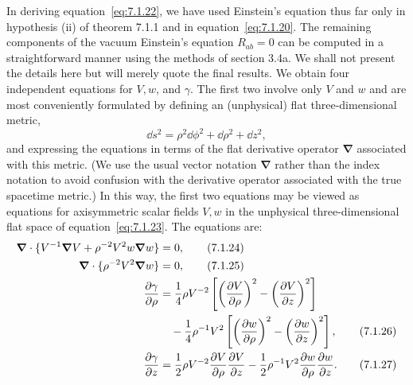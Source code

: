 In deriving equation~\eqref{eq:7.1.22}, we have used Einstein's equation thus far
only in hypothesis (ii) of theorem 7.1.1 and in equation~\eqref{eq:7.1.20}. The
remaining components of the vacuum Einstein's equation \(R_{ab}=0\) can be
computed in a straightforward manner using the methods of section 3.4a. We shall
not present the details here but will merely quote the final results. We obtain four
independent equations for \(V,w\), and \(\gamma\). The first two involve only
\(V\) and \(w\) and are most conveniently formulated by defining an (unphysical)
flat three-dimensional metric,
\begin{equation}
  \dd s^2=\rho^2\dd\phi^2+\dd\rho^2+\dd z^2 ,
  \tag{7.1.23}\label{eq:7.1.23}
\end{equation}
and expressing the equations in terms of the flat derivative operator \(\boldsymbol{\nabla}\)
associated with this metric. (We use the usual vector notation \(\boldsymbol{\nabla}\) rather
than the index notation to avoid confusion with the derivative operator associated
with the true spacetime metric.) In this way, the first two equations may be viewed
as equations for axisymmetric scalar fields \(V,w\) in the unphysical
three-dimensional flat space of equation~\eqref{eq:7.1.23}. The equations are:
\begin{align}
  \boldsymbol{\nabla}\mathbin{\cdot}
    \{V^{-1}\boldsymbol{\nabla} V+\rho^{-2}V^2w\boldsymbol{\nabla} w\}&=0 ,
    \tag{7.1.24}\label{eq:7.1.24}\\
  \boldsymbol{\nabla}\mathbin{\cdot}
    \{\rho^{-2}V^2\boldsymbol{\nabla} w\}&=0 ,
    \tag{7.1.25}\label{eq:7.1.25}\\
  \frac{\partial\gamma}{\partial\rho}
    &=\frac14\rho V^{-2}
      \left[\left(\frac{\partial V}{\partial\rho}\right)^2
            -\left(\frac{\partial V}{\partial z}\right)^2\right]\notag\\
    &\quad-\frac14\rho^{-1}V^2
      \left[\left(\frac{\partial w}{\partial\rho}\right)^2
            -\left(\frac{\partial w}{\partial z}\right)^2\right] ,
    \tag{7.1.26}\label{eq:7.1.26}\\
  \frac{\partial\gamma}{\partial z}
    &=\frac12\rho V^{-2}\frac{\partial V}{\partial\rho}
      \frac{\partial V}{\partial z}
      -\frac12\rho^{-1}V^2\frac{\partial w}{\partial\rho}
      \frac{\partial w}{\partial z} .
    \tag{7.1.27}\label{eq:7.1.27}
\end{align}

